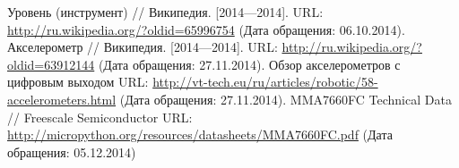 \documentclass[document.tex]{subfiles}
\begin{document}
\clearpage
{}
\begin{thebibliography}{@@@@}	
		Уровень (инструмент) // Википедия. [2014—2014].
		URL: {\url{http://ru.wikipedia.org/?oldid=65996754}} 
		(Дата обращения: 06.10.2014).
		Акселерометр // Википедия. [2014—2014]. 
		URL: {\url{http://ru.wikipedia.org/?oldid=63912144}}
		(Дата обращения: 27.11.2014).
		Обзор акселерометров с цифровым выходом
		URL: {\url{http://vt-tech.eu/ru/articles/robotic/58-accelerometers.html}}
		(Дата обращения: 27.11.2014).
		MMA7660FC Technical Data // Freescale Semiconductor
		URL: {\url{http://micropython.org/resources/datasheets/MMA7660FC.pdf}}
		(Дата обращения: 05.12.2014)
	\end{thebibliography}
\end{document}
